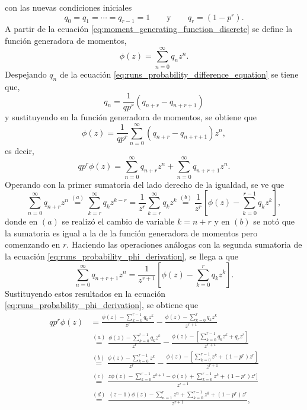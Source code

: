 \documentclass[a4paper]{report}
\begin{document}
con las nuevas condiciones iniciales
\begin{equation}\label{eq:runs_probability_difference_equation_ic}
 q_0=q_1=\cdots=q_{r-1}=1\qquad\textrm{y}\qquad q_r=(1-p^r).
\end{equation}
A partir de la ecuación \ref{eq:moment_generating_function_discrete} se define la función generadora de momentos,
\[
 \phi(z)=\sum_{n=0}^{\infty}q_nz^{n}.
\]
Despejando \(q_n\) de la ecuación \ref{eq:runs_probability_difference_equation} se tiene que,
\[
 q_n=\frac{1}{qp^r}\left(q_{n+r}-q_{n+r+1}\right)
\]
y sustituyendo en la función generadora de momentos, se obtiene que
\[
 \phi(z)=\frac{1}{qp^r}\sum_{n=0}^{\infty}\left(q_{n+r}-q_{n+r+1}\right)z^{n},
\]
es decir,
\begin{equation}\label{eq:runs_probability_phi_derivation}
 qp^r\phi(z)=\sum_{n=0}^{\infty}q_{n+r}z^{n}+\sum_{n=0}^{\infty}q_{n+r+1}z^{n}.
\end{equation}
Operando con la primer sumatoria del lado derecho de la igualdad, se ve que
\[
 \sum_{n=0}^{\infty}q_{n+r}z^{n}
 \overset{(a)}{=}\sum_{k=r}^{\infty}q_{k}z^{k-r}=\frac{1}{z^r}\sum_{k=r}^{\infty}q_{k}z^k
 \overset{(b)}{=}\frac{1}{z^r}\left[\phi(z)-\sum_{k=0}^{r-1}q_{k}z^k\right],
\]
donde en \((a)\) se realizó el cambio de variable \(k=n+r\) y en \((b)\) se notó que la sumatoria es igual a la de la función generadora de momentos pero comenzando en \(r\). Haciendo las operaciones análogas con la segunda sumatoria de la ecuación \ref{eq:runs_probability_phi_derivation}, se llega a que
\[
 \sum_{n=0}^{\infty}q_{n+r+1}z^{n}=\frac{1}{z^{r+1}}\left[\phi(z)-\sum_{k=0}^{r}q_{k}z^k\right].
\]
Sustituyendo estos resultados en la ecuación \ref{eq:runs_probability_phi_derivation}, se obtiene que
\begin{align*}
 qp^r\phi(z)&=\frac{\phi(z)-\sum_{k=0}^{r-1}q_{k}z^k}{z^r}-\frac{\phi(z)-\sum_{k=0}^{r}q_{k}z^k}{z^{r+1}}\\
 &\overset{(a)}{=}\frac{\phi(z)-\sum_{k=0}^{r-1}q_{k}z^k}{z^r}-\frac{\phi(z)-\left[\sum_{k=0}^{r-1}q_{k}z^k+q_rz^r\right]}{z^{r+1}}\\
 &\overset{(b)}{=}\frac{\phi(z)-\sum_{k=0}^{r-1}z^k}{z^r}-\frac{\phi(z)-\left[\sum_{k=0}^{r-1}z^k+(1-p^r)z^r\right]}{z^{r+1}}\\
 &\overset{(c)}{=}\frac{z\phi(z)-\sum_{k=0}^{r-1}z^{k+1}-\phi(z)+\sum_{k=0}^{r-1}z^k+(1-p^r)z^r]}{z^{r+1}}\\
 &\overset{(d)}{=}\frac{(z-1)\phi(z)-\sum_{n=1}^{r}z^{n}+\sum_{k=0}^{r-1}z^k+(1-p^r)z^r}{z^{r+1}},
\end{align*}
\end{document}
